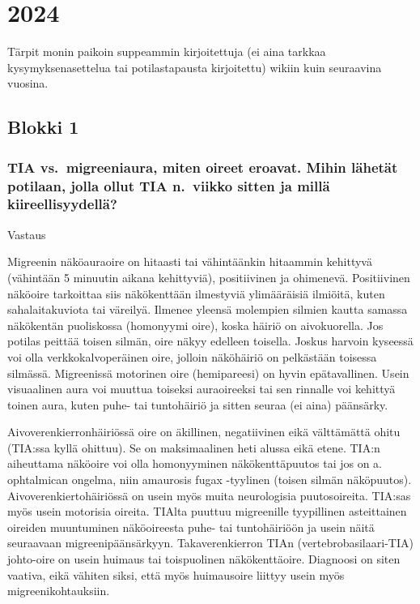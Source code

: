 \documentclass[
]{book}
\begin{document}
\chapter{2024}\label{section-2}

Tärpit monin paikoin suppeammin kirjoitettuja (ei aina tarkkaa kysymyksenasettelua tai potilastapausta kirjoitettu) wikiin kuin seuraavina vuosina.

\section{Blokki 1}\label{blokki-1-2}

\subsection{TIA vs.~migreeniaura, miten oireet eroavat. Mihin lähetät potilaan, jolla ollut TIA n.~viikko sitten ja millä kiireellisyydellä?}\label{tia-vs.-migreeniaura-miten-oireet-eroavat.-mihin-luxe4hetuxe4t-potilaan-jolla-ollut-tia-n.-viikko-sitten-ja-milluxe4-kiireellisyydelluxe4}

Vastaus

Migreenin näköauraoire on hitaasti tai vähintäänkin hitaammin kehittyvä (vähintään 5 minuutin aikana kehittyviä), positiivinen ja ohimenevä. Positiivinen näköoire tarkoittaa siis näkökenttään ilmestyviä ylimääräisiä ilmiöitä, kuten sahalaitakuviota tai väreilyä. Ilmenee yleensä molempien silmien kautta samassa näkökentän puoliskossa (homonyymi oire), koska häiriö on aivokuorella. Jos potilas peittää toisen silmän, oire näkyy edelleen toisella. Joskus harvoin kyseessä voi olla verkkokalvoperäinen oire, jolloin näköhäiriö on pelkästään toisessa silmässä. Migreenissä motorinen oire (hemipareesi) on hyvin epätavallinen. Usein visuaalinen aura voi muuttua toiseksi auraoireeksi tai sen rinnalle voi kehittyä toinen aura, kuten puhe- tai tuntohäiriö ja sitten seuraa (ei aina) päänsärky.

Aivoverenkierronhäiriössä oire on äkillinen, negatiivinen eikä välttämättä ohitu (TIA:ssa kyllä ohittuu). Se on maksimaalinen heti alussa eikä etene. TIA:n aiheuttama näköoire voi olla homonyyminen näkökenttäpuutos tai jos on a. ophtalmican ongelma, niin amaurosis fugax -tyylinen (toisen silmän näköpuutos). Aivoverenkiertohäiriössä on usein myös muita neurologisia puutosoireita. TIA:sas myös usein motorisia oireita. TIAlta puuttuu migreenille tyypillinen asteittainen oireiden muuntuminen näköoireesta puhe- tai tuntohäiriöön ja usein näitä seuraavaan migreenipäänsärkyyn. Takaverenkierron TIAn (vertebrobasilaari-TIA) johto-oire on usein huimaus tai toispuolinen näkökenttäoire. Diagnoosi on siten vaativa, eikä vähiten siksi, että myös huimausoire liittyy usein myös migreenikohtauksiin.
\end{document}
